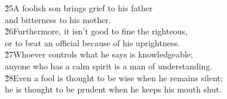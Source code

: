 \begin{poetry}
\poeml \v{25}A foolish son brings grief to his father \\
\poemll    and bitterness to his mother. \\
\poeml \v{26}Furthermore, it isn't good to fine the righteous, \\
\poemll    or to beat an official because of his uprightness. \\
\poeml \v{27}Whoever controls what he says is knowledgeable; \\
\poemll    anyone who has a calm spirit is a man of understanding. \\
\poeml \v{28}Even a fool is thought to be wise when he remains silent; \\
\poemll    he is thought to be prudent when he keeps his mouth shut.
\end{poetry}

